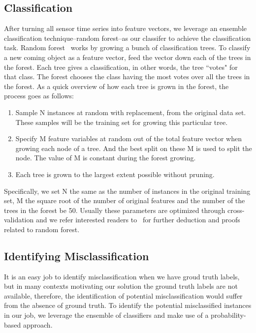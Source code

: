 \subsection{Classification}
After turning all sensor time series into feature vectors, we leverage an ensemble classification technique--random forest--as our classifer to achieve the classification task. Random forest~\cite{RF} works by growing a bunch of classification trees. To classify a new coming object as a feature vector, feed the vector down each of the trees in the forest. Each tree gives a classification, in other words, the tree ``votes" for that class. The forest chooses the class having the most votes over all the trees in the forest. As a quick overview of how each tree is grown in the forest, the process goes as follows:
\begin{enumerate}
\item Sample N instances at random with replacement, from the original data set. These samples will be the training set for growing this particular tree.
\item Specify M feature variables at random out of the total feature vector when growing each node of a tree. And the best split on these M is used to split the node. The value of M is constant during the forest growing.
\item Each tree is grown to the largest extent possible without pruning.
\end{enumerate}
Specifically, we set N the same as the number of instances in the original training set, M the square root of the number of original features and the number of the trees in the forest be 50. Usually these parameters are optimized through cross-validation and we refer interested readers to~\cite{RF} for further deduction and proofs related to random forest.


\subsection{Identifying Misclassification}
It is an easy job to identify misclassification when we have groud truth labels, but in many contexts motivating our solution the ground truth labels are not available, therefore, the identification of potential misclassification would suffer from the absence of ground truth. To identify the potential misclassified instances in our job, we leverage the ensemble of classifiers and make use of a probability-based approach.